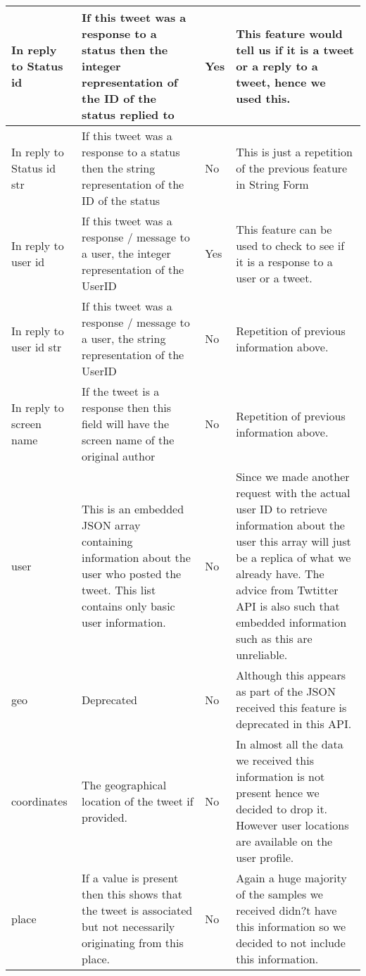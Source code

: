 \begin{landscape}
\begin{longtable}{|C{1.00in}|C{2.50in}|C{.60in}|C{5.00in}|}
 \hline
In reply to Status id & If this tweet was a response to a status then the integer representation of the ID of the status replied to & Yes & This feature would tell us if it is a tweet or a reply to a tweet, hence we used this.\\
\hline
In reply to Status id str & If this tweet was a response to a status then the string representation of the ID of the status  & No  & This is just a repetition of the previous feature in String Form\\
\hline
In reply to user id & If this tweet was a response / message to a user, the integer representation of the UserID & Yes & This feature can be used to check to see if it is a response to a user or a tweet. \\
\hline
In reply to user id str & If this tweet was a response / message to a user, the string representation of the UserID  & No  & Repetition of previous information above. \\     
\hline                                                                                                             
In reply to screen name & If the tweet is a response then this field will have the screen name of the original author  & No  & Repetition of previous information above.  \\    
\hline                                                                                                                                                                                                          
user  & This is an embedded JSON array containing information about the user who posted the tweet. This list contains only basic user information. & No  & Since we made another request with the actual user ID to retrieve information about the user this array will just be a replica of what we already have. The advice from Twtitter API is also such that embedded information such as this are unreliable. \\
\hline
geo & Deprecated   & No  & Although this appears as part of the JSON received this feature is deprecated in this API. \\
\hline
coordinates  & The geographical location of the tweet if provided. & No  & In almost all the data we received this information is not present hence we decided to drop it. However user locations are available on the user profile. \\
\hline
place  & If a value is present then this shows that the tweet is associated but not necessarily originating from this place. & No  & Again a huge majority of the samples we received didn?t have this information so we decided to not include this information. \\

\end{longtable}
\end{landscape}
